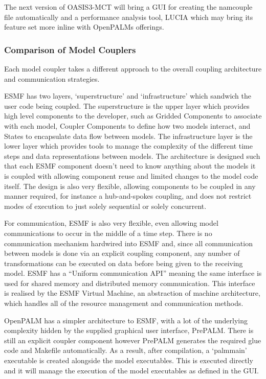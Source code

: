 \documentclass{acm_proc_article-sp}
\renewcommand{\_}{\underscore\hspace{0pt}}
\begin{document}
The next version of OASIS3-MCT will bring a GUI for creating the namcouple file
automatically and a performance analysis tool, LUCIA \cite{Maisonnave} which may
bring its feature set more inline with OpenPALMs offerings.

\subsubsection*{Comparison of Model Couplers}

Each model coupler takes a different approach to the overall coupling
architecture and communication strategies.

ESMF has two layers, `superstructure' and `infrastructure' which sandwich the
user code being coupled. The superstructure is the upper layer which provides
high level components to the developer, such as Gridded Components to associate
with each model, Coupler Components to define how two models interact, and
States to encapsulate data flow between models. The infrastructure layer is the
lower layer which provides tools to manage the complexity of the different time
steps and data representations between models. The architecture is designed such
that each ESMF component doesn't need to know anything about the models it is
coupled with allowing component reuse and limited changes to the model code
itself. The design is also very flexible, allowing components to be coupled in
any manner required, for instance a hub-and-spokes coupling, and does not
restrict modes of execution to just solely sequential or solely concurrent.

For communication, ESMF is also very flexible, even allowing model
communications to occur in the middle of a time step. There is no communication
mechanism hardwired into ESMF and, since all communication between models is
done via an explicit coupling component, any number of transformations can be
executed on data before being given to the receiving model. ESMF has a ``Uniform
communication API'' \cite{ESMF2014} meaning the same interface is used for
shared memory and distributed memory communication. This interface is realised
by the ESMF Virtual Machine, an abstraction of machine architecture, which
handles all of the resource management and communication methods.

OpenPALM has a simpler architecture to ESMF, with a lot of the underlying
complexity hidden by the supplied graphical user interface, PrePALM. There is
still an explicit coupler component however PrePALM generates the required glue
code and Makefile automatically. As a result, after compilation, a `palm\_main'
executable is created alongside the model executables. This is executed directly
and it will manage the execution of the model executables as defined in the GUI.
\end{document}
